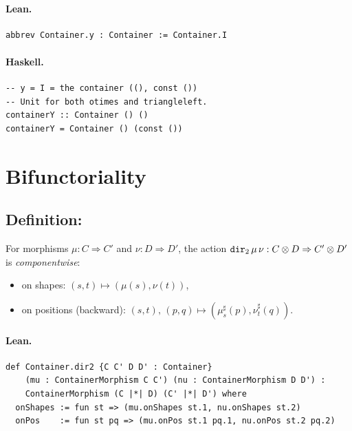 \documentclass[11pt,a4paper]{article}
\begin{document}
\paragraph{Lean.}
\begin{lstlisting}[style=lean]
abbrev Container.y : Container := Container.I
\end{lstlisting}

\paragraph{Haskell.}
\begin{lstlisting}[style=haskell]
-- y = I = the container ((), const ())
-- Unit for both otimes and triangleleft.
containerY :: Container () ()
containerY = Container () (const ())
\end{lstlisting}


\section{Bifunctoriality}

\subsection{Definition: }

\begin{defn}
For morphisms $\mu : C \Rightarrow C'$ and $\nu : D \Rightarrow D'$, the action
$\texttt{dir}_2\,\mu\,\nu : C \otimes D \Rightarrow C' \otimes D'$ is
\emph{componentwise}:
\begin{itemize}
  \item on shapes: $(s,t) \mapsto (\mu(s), \nu(t))$,
  \item on positions (backward): $(s,t),\,(p,q) \mapsto (\mu^\sharp_s(p), \nu^\sharp_t(q))$.
\end{itemize}
\end{defn}

\paragraph{Lean.}
\begin{lstlisting}[style=lean]
def Container.dir2 {C C' D D' : Container}
    (mu : ContainerMorphism C C') (nu : ContainerMorphism D D') :
    ContainerMorphism (C |*| D) (C' |*| D') where
  onShapes := fun st => (mu.onShapes st.1, nu.onShapes st.2)
  onPos    := fun st pq => (mu.onPos st.1 pq.1, nu.onPos st.2 pq.2)
\end{lstlisting}
\end{document}
